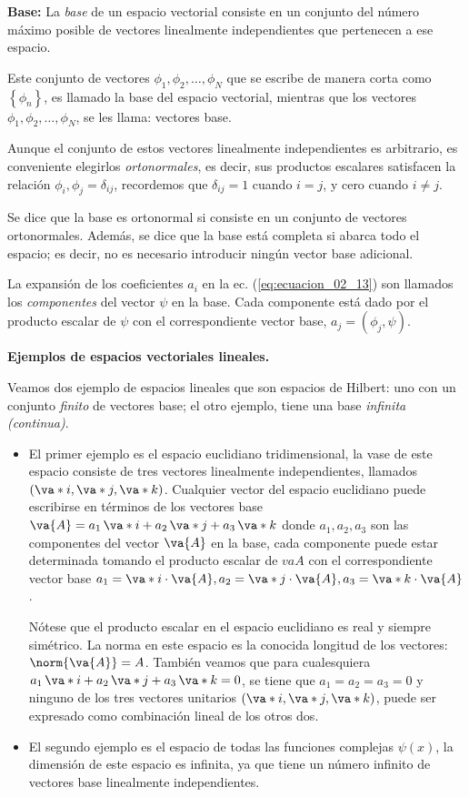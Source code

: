 \textbf{Base: } La \emph{base} de un espacio vectorial consiste en un conjunto del número máximo posible de vectores linealmente independientes que pertenecen a ese espacio.
\par
Este conjunto de vectores $\phi_{1}, \phi_{2}, \ldots, \phi_{N}$ que se escribe de manera corta como $\left\{ \phi_{n} \right\}$, es llamado la base del espacio vectorial, mientras que los vectores $\phi_{1}, \phi_{2}, \ldots, \phi_{N}$, se les llama: vectores base.
\par
Aunque el conjunto de estos vectores linealmente independientes es arbitrario, es conveniente elegirlos \emph{ortonormales}, es decir, sus productos escalares satisfacen la relación $\phi_{i}, \phi_{j} = \delta_{ij}$, recordemos que $\delta_{ij} = 1$ cuando $i = j$, y cero cuando $i \neq j$.
\par
Se dice que la base es ortonormal si consiste en un conjunto de vectores ortonormales. Además, se dice que la base está completa si abarca todo el espacio; es decir, no es necesario introducir ningún vector base adicional.
\par
La expansión de los coeficientes $a_{i}$ en la ec. (\ref{eq:ecuacion_02_13}) son llamados los \emph{componentes} del vector $\psi$ en la base. Cada componente está dado por el producto escalar de $\psi$ con el correspondiente vector base, $a_{j} = (\phi_{j}, \psi)$.
\par
\textbf{Ejemplos de espacios vectoriales lineales.}

Veamos dos ejemplo de espacios lineales que son espacios de Hilbert: uno con un conjunto \emph{finito} de vectores base; el otro ejemplo, tiene una base \emph{infinita (continua)}.
\begin{itemize}
\item El primer ejemplo es el espacio euclidiano tridimensional, la vase de este espacio consiste de tres vectores linealmente independientes, llamados $(\va*{i}, \va*{j}, \va*{k})$. Cualquier vector del espacio euclidiano puede escribirse en términos de los vectores base $\va{A} = a_{1} \, \va*{i} + a_{2} \, \va*{j} + a_{3} \, \va*{k}$ donde $a_{1}, a_{2}, a_{3}$ son las componentes del vector $\va{A}$ en la base, cada componente puede estar determinada tomando el producto escalar de $va{A}$ con el correspondiente vector base $a_{1} = \va*{i} \cdot \va{A}, a_{2} = \va*{j} \cdot \va{A}, a_{3} = \va*{k} \cdot \va{A}$.
\par
Nótese que el producto escalar en el espacio euclidiano es real y siempre simétrico. La norma en este espacio es la conocida longitud de los vectores: $\norm{\va{A}} = A$. También veamos que para cualesquiera $a_{1} \, \va*{i} + a_{2} \, \va*{j} + a_{3} \, \va*{k} = 0$, se tiene que $a_{1} = a_{2} = a_{3} = 0$ y ninguno de los tres vectores unitarios $(\va*{i}, \va*{j}, \va*{k})$, puede ser expresado como combinación lineal de los otros dos.
\item El segundo ejemplo es el espacio de todas las funciones complejas $\psi (x)$, la dimensión de este espacio es infinita, ya que tiene un número infinito de vectores base linealmente independientes.
\end{itemize}

